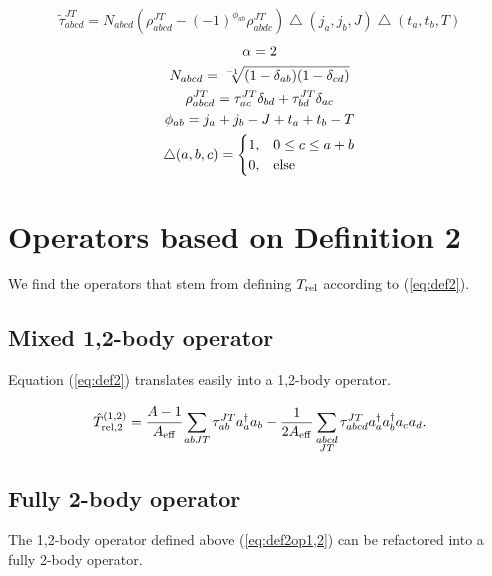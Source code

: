 \documentclass{article}
\begin{document}
\begin{equation}\label{eq:ttil}
  \tilde{\tau}_{abcd}^{JT} = N_{abcd}
  \left( \rho_{abcd}^{JT} -(-1)^{\phi_{ab}} \rho_{abdc}^{JT} \right)
  \bigtriangleup(j_a,j_b,J) \bigtriangleup(t_a,t_b,T)
\end{equation}
\begin{gather*}
  \alpha = 2\\
  N_{abcd} = \sqrt[-1]{(1-\delta_{ab})(1-\delta_{cd})}\\
  \rho_{abcd}^{JT} =
  \tau_{ac}^{JT}\delta_{bd} + \tau_{bd}^{JT}\delta_{ac}\\
  \phi_{ab} = j_a+j_b-J + t_a+t_b-T\\
  \bigtriangleup(a,b,c) = 
  \begin{cases}
    1, & 0\leq c\leq a+b\\
    0, & \rm{else}\\
  \end{cases}
\end{gather*}

\section{Operators based on Definition 2}

We find the operators that stem from defining $T_{\rm{rel}}$ according
to (\ref{eq:def2}).

\subsection{Mixed 1,2-body operator}

Equation (\ref{eq:def2}) translates easily into a 1,2-body operator.

\begin{equation}\label{eq:def2op1,2}
  \hat{T}_{\rm{rel},2}^{(1,2)} = \cfrac{A-1}{A_{\rm{eff}}}
  \displaystyle\sum_{abJT}\tau_{ab}^{JT}a_a^{\dagger}a_b
  -\frac{1}{2A_{\rm{eff}}} \displaystyle\sum_{\substack{abcd\\JT}}
  \tau_{abcd}^{JT}a_a^{\dagger}a_b^{\dagger}a_ca_d.
\end{equation}

\subsection{Fully 2-body operator}

The 1,2-body operator defined above (\ref{eq:def2op1,2}) can be
refactored into a fully 2-body operator.
\end{document}
